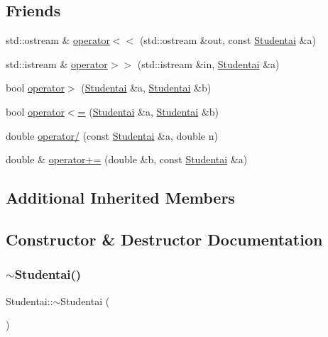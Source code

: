 \subsection*{Friends}
\begin{DoxyCompactItemize}
\item 
std\+::ostream \& \mbox{\hyperlink{class_studentai_a7fa0ac541336749ef2d674fd1996e8d5}{operator$<$$<$}} (std\+::ostream \&out, const \mbox{\hyperlink{class_studentai}{Studentai}} \&a)
\item 
std\+::istream \& \mbox{\hyperlink{class_studentai_a26a2195becea6f359ea305a80239387e}{operator$>$$>$}} (std\+::istream \&in, \mbox{\hyperlink{class_studentai}{Studentai}} \&a)
\item 
bool \mbox{\hyperlink{class_studentai_a6d7c4a8ee5a8fa7c191e5ecfb41645b5}{operator$>$}} (\mbox{\hyperlink{class_studentai}{Studentai}} \&a, \mbox{\hyperlink{class_studentai}{Studentai}} \&b)
\item 
bool \mbox{\hyperlink{class_studentai_a899347d8f518e1b28175dda7b5674cf2}{operator$<$=}} (\mbox{\hyperlink{class_studentai}{Studentai}} \&a, \mbox{\hyperlink{class_studentai}{Studentai}} \&b)
\item 
double \mbox{\hyperlink{class_studentai_aa6578f090b8fb8fa338d6d1481b787bf}{operator/}} (const \mbox{\hyperlink{class_studentai}{Studentai}} \&a, double n)
\item 
double \& \mbox{\hyperlink{class_studentai_a8525ba4a0a62f787170476026ab2e661}{operator+=}} (double \&b, const \mbox{\hyperlink{class_studentai}{Studentai}} \&a)
\end{DoxyCompactItemize}
\subsection*{Additional Inherited Members}


\subsection{Constructor \& Destructor Documentation}
\mbox{\label{class_studentai_a10895815f551906aae4c2823bfd1bbc5}} 
\subsubsection{\texorpdfstring{$\sim$Studentai()}{~Studentai()}}
{\footnotesize\ttfamily Studentai\+::$\sim$\+Studentai (\begin{DoxyParamCaption}{ }\end{DoxyParamCaption})\hspace{0.3cm}{\ttfamily [inline]}}

